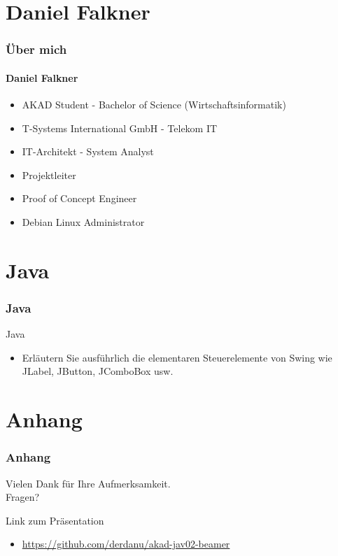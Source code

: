 \documentclass[xcolor=dvipsnames]{beamer}
\subtitle{Modul JAV02} %
\institute{AKAD University} %
\title{\Title}
\author{\Author}
\date{05/06.September.2014}
\begin{document}
\begin{frame}
    \titlepage
\end{frame}


\frame{\tableofcontents[hideothersubsections]} 

\section{Daniel Falkner}
\begin{frame} %
  \frametitle{Über mich} %
  \framesubtitle{Daniel Falkner} %
  \begin{block}{}
	  \begin{itemize}
	  	\item AKAD Student - Bachelor of Science (Wirtschaftsinformatik)
  		\item T-Systems International GmbH - Telekom IT
  		\item IT-Architekt - System Analyst
		\item Projektleiter
		\item Proof of Concept Engineer
  		\item Debian Linux Administrator
	  \end{itemize}
  \end{block}
\end{frame}


\section{Java}
\begin{frame} %
  \frametitle{Java} %
  \begin{block}{Java}
	  \begin{itemize}
		\item Erläutern Sie ausführlich die elementaren Steuerelemente von Swing wie JLabel, JButton, JComboBox usw.
	  \end{itemize}
  \end{block}
\end{frame}


\section{Anhang}
\begin{frame}
  \frametitle{Anhang} %
	\begin{block}{}	
		\begin{center}
			Vielen Dank für Ihre Aufmerksamkeit. \\
			Fragen?
		\end{center}	
	\end{block}
	\begin{block}{Link zum Präsentation}	
		\begin{itemize}
			\item \url{https://github.com/derdanu/akad-jav02-beamer}
		\end{itemize}
	\end{block}
\end{frame}
\end{document}
